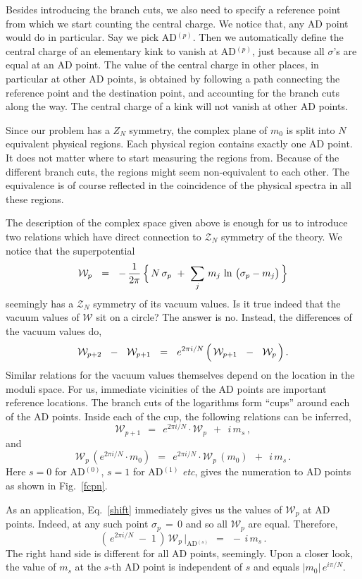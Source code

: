 \documentclass[epsfig,12pt]{article}
\def\beq{\begin{equation}}
\def\eeq{\end{equation}}
\def\beq{\begin{equation}}
\def\eeq{\end{equation}}
\newcommand{\mc}[1]{\mathcal{#1}}
\newcommand{\W}{\mathcal{W}}
\begin{document}
	Besides introducing the branch cuts, we also need to specify a reference point from which we start counting
	the central charge.
	We notice that, any AD point would do in particular.
	Say we pick AD$^{(p)}$.
	Then we automatically define the central charge of an elementary kink to vanish at AD$^{(p)}$,  just because
	all $ \sigma $'s are equal at an AD point.
	The value of the central charge in other places, in particular at other AD points, is obtained by following
	a path connecting the reference point and the destination point, and accounting for the branch cuts
	along the way. 
	The central charge of a kink will not vanish at other AD points. 

	Since our problem has a $ Z_N $ symmetry, the complex plane of $ m_0 $ is split into $ N $ equivalent physical
	regions.
	Each physical region contains exactly one AD point.
	It does not matter where to start measuring the regions from.
	Because of the different branch cuts, the regions might seem non-equivalent to each other.
	The equivalence is of course reflected in the coincidence of the physical spectra in all these regions. 


	The description of the complex space given above is enough for us to introduce two relations which have
	direct connection to $ \mc{Z}_N $ symmetry of the theory.
	We notice that the superpotential
\beq
	\W_p ~~=~~ 
		-\, \frac{1}{2\pi}\,  
                \Bigl\{\, N\, \sigma_p ~+~ \sum_j\, m_j\, \ln\, \big( \sigma_p - m_j \big) \,\Bigr\}
\eeq
	seemingly has a $ \mc{Z}_N $ symmetry of its vacuum values. 
	Is it true indeed that the vacuum values of $ \W $ sit on a circle?
	The answer is no. 
	Instead, the differences of the vacuum values do,
\beq
\label{Wdiff}
	\W_{p+2}  ~~-~~  \W_{p+1}  ~~=~~ 
        e^{2 \pi i / N}\, \Bigl(\,  \W_{p+1}  ~~-~~ \W_{p}   \,\Bigr) \,.
\eeq
	Similar relations for the vacuum values themselves depend on the location in the moduli space.
	For us, immediate vicinities of the AD points are important reference locations.
	The branch cuts of the logarithms form ``cups'' around each of the AD points.
	Inside each of the cup, the following relations can be inferred,
\beq
\label{shift}
	\W_{p+1} ~~=~~ e^{2 \pi i / N} \cdot \W_p ~~+~~ i\, m_s\,,
\eeq
	and
\beq
\label{shiftm}
	\W_p\, (e^{2 \pi i / N} \cdot m_0) ~~=~~ e^{2 \pi i / N} \cdot \W_p\, (m_0) ~~+~~ i\, m_s\,.
\eeq
	Here $ s = 0 $ for AD$^{(0)}$, $ s = 1 $ for AD$^{(1)}$ {\it etc}, gives the numeration
	to AD points as shown in Fig.~\ref{fcpn}.

	As an application, Eq.~\eqref{shift} immediately gives us the values of $ \W_p $ at AD points.
	Indeed, at any such point $ \sigma_p \,=\, 0 $ and so all $ \W_p $ are equal.
	Therefore,
\beq
	\left(\, e^{2 \pi i / N} \;-\; 1 \,\right)\, \W_p\, \biggr|_\text{AD$^{(s)}$} ~~=~~ -\, i\, m_s\,.
\eeq
	The right hand side is different for all AD points, seemingly. 
	Upon a closer look, the value of $ m_s $ at the $ s $-th AD point is independent of $ s $ and equals
	$ |m_0|\,e^{i \pi / N} $.
\end{document}
